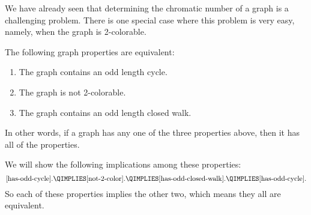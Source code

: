 We have already seen that determining the chromatic number of a graph is a
challenging problem.  There is one special case where this problem is very
easy, namely, when the graph is 2-colorable.

\begin{theorem}\label{thm:2-colorable-equiv}
The following graph properties are equivalent:

\begin{enumerate}

\item\label{has-odd-cycle}
The graph contains an odd length cycle.

\item\label{not-2-color}
The graph is not 2-colorable.

\item\label{has-odd-closed-walk}
The graph contains an odd length closed walk.

\end{enumerate}
\end{theorem}
In other words, if a graph has any one of the three properties above, then
it has all of the properties.

We will show the following implications among these properties:
\[
\text{\ref{has-odd-cycle}.} \QIMPLIES \text{\ref{not-2-color}.} \QIMPLIES
\text{\ref{has-odd-closed-walk}.} \QIMPLIES
\text{\ref{has-odd-cycle}}.
\]
So each of these properties implies the other two,
 which means they all are equivalent.
\iffalse
\footnote{Mutual
  implication follows from transivity of implication,
  Rule~\ref{rule:transitivity} in Section~\ref{sec:logical_deduction}}
\fi


